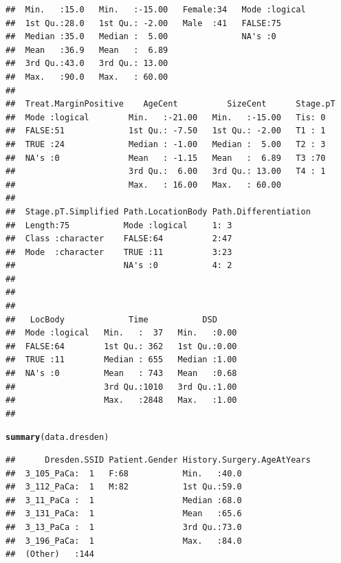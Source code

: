 \documentclass{article}\usepackage[]{graphicx}\usepackage[]{color}
\makeatletter
\newcommand{\hlstd}[1]{\textcolor[rgb]{0.345,0.345,0.345}{#1}}%
\newcommand{\hlkwd}[1]{\textcolor[rgb]{0.737,0.353,0.396}{\textbf{#1}}}%
\newenvironment{kframe}{%
 \def\at@end@of@kframe{}%
 \ifinner\ifhmode%
  \def\at@end@of@kframe{\end{minipage}}%
  \begin{minipage}{\columnwidth}%
 \fi\fi%
 \def\FrameCommand##1{\hskip\@totalleftmargin \hskip-\fboxsep
 \colorbox{shadecolor}{##1}\hskip-\fboxsep
     \hskip-\linewidth \hskip-\@totalleftmargin \hskip\columnwidth}%
 \MakeFramed {\advance\hsize-\width
   \@totalleftmargin\z@ \linewidth\hsize
   \@setminipage}}%
 {\par\unskip\endMakeFramed%
 \at@end@of@kframe}
\newenvironment{knitrout}{}{} %
\makeatother
\begin{document}
\begin{knitrout}
\begin{kframe}
\begin{verbatim}
##  Min.   :15.0   Min.   :-15.00   Female:34   Mode :logical  
##  1st Qu.:28.0   1st Qu.: -2.00   Male  :41   FALSE:75       
##  Median :35.0   Median :  5.00               NA's :0        
##  Mean   :36.9   Mean   :  6.89                              
##  3rd Qu.:43.0   3rd Qu.: 13.00                              
##  Max.   :90.0   Max.   : 60.00                              
##                                                             
##  Treat.MarginPositive    AgeCent          SizeCent      Stage.pT
##  Mode :logical        Min.   :-21.00   Min.   :-15.00   Tis: 0  
##  FALSE:51             1st Qu.: -7.50   1st Qu.: -2.00   T1 : 1  
##  TRUE :24             Median : -1.00   Median :  5.00   T2 : 3  
##  NA's :0              Mean   : -1.15   Mean   :  6.89   T3 :70  
##                       3rd Qu.:  6.00   3rd Qu.: 13.00   T4 : 1  
##                       Max.   : 16.00   Max.   : 60.00           
##                                                                 
##  Stage.pT.Simplified Path.LocationBody Path.Differentiation
##  Length:75           Mode :logical     1: 3                
##  Class :character    FALSE:64          2:47                
##  Mode  :character    TRUE :11          3:23                
##                      NA's :0           4: 2                
##                                                            
##                                                            
##                                                            
##   LocBody             Time           DSD      
##  Mode :logical   Min.   :  37   Min.   :0.00  
##  FALSE:64        1st Qu.: 362   1st Qu.:0.00  
##  TRUE :11        Median : 655   Median :1.00  
##  NA's :0         Mean   : 743   Mean   :0.68  
##                  3rd Qu.:1010   3rd Qu.:1.00  
##                  Max.   :2848   Max.   :1.00  
## 
\end{verbatim}
\begin{alltt}
\hlkwd{summary}\hlstd{(data.dresden)}
\end{alltt}
\begin{verbatim}
##      Dresden.SSID Patient.Gender History.Surgery.AgeAtYears
##  3_105_PaCa:  1   F:68           Min.   :40.0              
##  3_112_PaCa:  1   M:82           1st Qu.:59.0              
##  3_11_PaCa :  1                  Median :68.0              
##  3_131_PaCa:  1                  Mean   :65.6              
##  3_13_PaCa :  1                  3rd Qu.:73.0              
##  3_196_PaCa:  1                  Max.   :84.0              
##  (Other)   :144                                            

\end{verbatim}
\end{kframe}
\end{knitrout}
\end{document}
